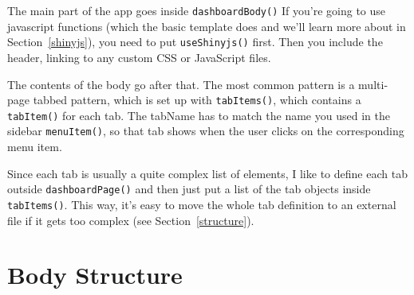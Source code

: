 \documentclass[
  oneside]{book}
\newenvironment{Shaded}{\begin{snugshade}}{\end{snugshade}}
\newcommand{\AttributeTok}[1]{\textcolor[rgb]{0.77,0.63,0.00}{#1}}
\newcommand{\CommentTok}[1]{\textcolor[rgb]{0.56,0.35,0.01}{\textit{#1}}}
\newcommand{\FunctionTok}[1]{\textcolor[rgb]{0.00,0.00,0.00}{#1}}
\newcommand{\NormalTok}[1]{#1}
\newcommand{\SpecialCharTok}[1]{\textcolor[rgb]{0.00,0.00,0.00}{#1}}
\newcommand{\StringTok}[1]{\textcolor[rgb]{0.31,0.60,0.02}{#1}}
\begin{document}
The main part of the app goes inside \texttt{dashboardBody}\texttt{()} If you're going to use javascript functions (which the basic template does and we'll learn more about in Section~\ref{shinyjs}), you need to put \texttt{useShinyjs}\texttt{()} first. Then you include the header, linking to any custom CSS or JavaScript files.

The contents of the body go after that. The most common pattern is a multi-page tabbed pattern, which is set up with \texttt{tabItems}\texttt{()}, which contains a \texttt{tabItem}\texttt{()} for each tab. The \AttributeTok{tabName} has to match the name you used in the sidebar \texttt{menuItem}\texttt{()}, so that tab shows when the user clicks on the corresponding menu item.

\begin{Shaded}
\end{Shaded}

Since each tab is usually a quite complex list of elements, I like to define each tab outside \texttt{dashboardPage}\texttt{()} and then just put a list of the tab objects inside \texttt{tabItems}\texttt{()}. This way, it's easy to move the whole tab definition to an external file if it gets too complex (see Section~\ref{structure}).

\hypertarget{body-structure}{%
\section{Body Structure}\label{body-structure}}
\end{document}
